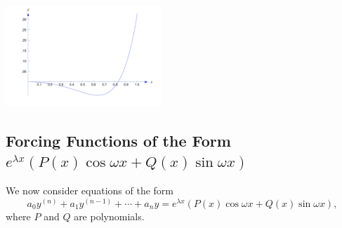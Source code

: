 \documentclass{ximera}
\begin{document}
\begin{example}
\begin{explanation}
\begin{image}
 \includegraphics[height=1.5in]{fig090302.jpg} 
\end{image}

\end{explanation}
\end{example}

\subsection*{Forcing Functions of the Form
$e^{\lambda x}\left(P(x)\cos\omega x+Q(x)\sin\omega x\right)$}

We  now consider equations of the form
$$
a_0y^{(n)}+a_1y^{(n-1)}+\cdots+a_ny=
e^{\lambda x}\left(P(x)\cos\omega x+Q(x)\sin\omega x\right),
$$
where $P$ and $Q$ are polynomials.
\end{document}
